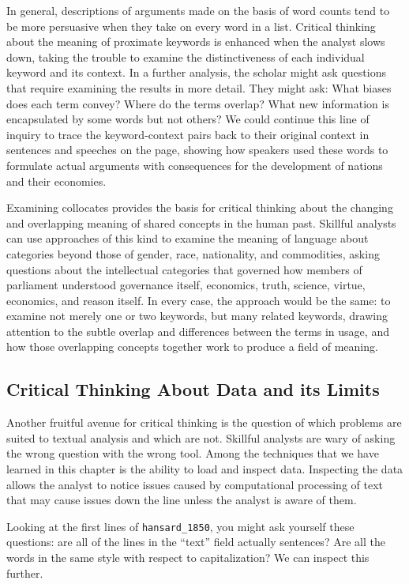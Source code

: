 \documentclass[
]{article}
\begin{document}
In general, descriptions of arguments made on the basis of word counts
tend to be more persuasive when they take on every word in a list.
Critical thinking about the meaning of proximate keywords is enhanced
when the analyst slows down, taking the trouble to examine the
distinctiveness of each individual keyword and its context. In a further
analysis, the scholar might ask questions that require examining the
results in more detail. They might ask: What biases does each term
convey? Where do the terms overlap? What new information is encapsulated
by some words but not others? We could continue this line of inquiry to
trace the keyword-context pairs back to their original context in
sentences and speeches on the page, showing how speakers used these
words to formulate actual arguments with consequences for the
development of nations and their economies.

Examining collocates provides the basis for critical thinking about the
changing and overlapping meaning of shared concepts in the human past.
Skillful analysts can use approaches of this kind to examine the meaning
of language about categories beyond those of gender, race, nationality,
and commodities, asking questions about the intellectual categories that
governed how members of parliament understood governance itself,
economics, truth, science, virtue, economics, and reason itself. In
every case, the approach would be the same: to examine not merely one or
two keywords, but many related keywords, drawing attention to the subtle
overlap and differences between the terms in usage, and how those
overlapping concepts together work to produce a field of meaning.

\subsection{Critical Thinking About Data and its
Limits}\label{critical-thinking-about-data-and-its-limits}

Another fruitful avenue for critical thinking is the question of which
problems are suited to textual analysis and which are not. Skillful
analysts are wary of asking the wrong question with the wrong tool.
Among the techniques that we have learned in this chapter is the ability
to load and inspect data. Inspecting the data allows the analyst to
notice issues caused by computational processing of text that may cause
issues down the line unless the analyst is aware of them.

Looking at the first lines of \texttt{hansard\_1850}, you might ask
yourself these questions: are all of the lines in the ``text'' field
actually sentences? Are all the words in the same style with respect to
capitalization? We can inspect this further.
\end{document}
